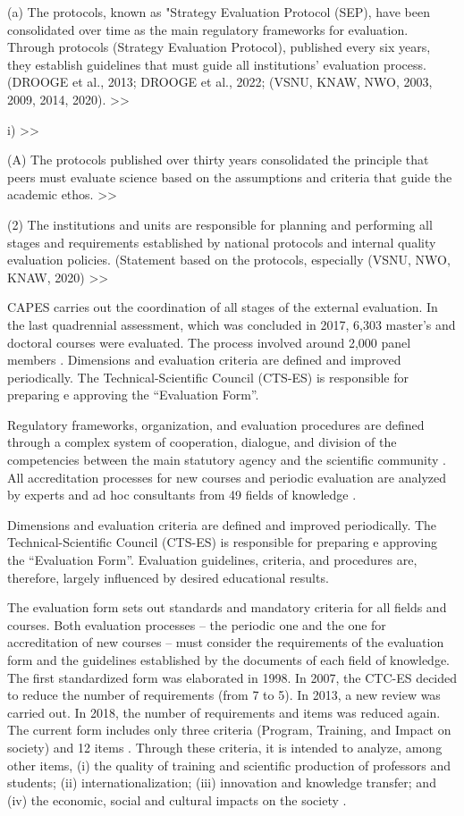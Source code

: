 (a)	The protocols, known as "Strategy Evaluation Protocol (SEP), have been consolidated over time as the main regulatory frameworks for evaluation. Through protocols (Strategy Evaluation Protocol), published every six years, they establish guidelines that must guide all institutions' evaluation process.  (DROOGE et al., 2013; DROOGE et al., 2022; (VSNU, KNAW, NWO, 2003, 2009, 2014, 2020). >>

i)	 >>

(A)	The protocols published over thirty years consolidated the principle that peers must evaluate science based on the assumptions and criteria that guide the academic ethos. >>



(2)	The institutions and units are responsible for planning and performing all stages and requirements established by national protocols and internal quality evaluation policies. (Statement based on the protocols, especially (VSNU, NWO, KNAW, 2020) >>


CAPES carries out the coordination of all stages of the external evaluation. In the last quadrennial assessment, which was concluded in 2017, 6,303 master’s and doctoral courses were evaluated. The process involved around 2,000 panel members \autocite{CAPES.2018}. Dimensions and evaluation criteria are defined and improved periodically. The Technical-Scientific Council (CTS-ES) is responsible for preparing e approving the “Evaluation Form”.

Regulatory frameworks, organization, and evaluation procedures are defined through a complex system of cooperation, dialogue, and division of the competencies between the main statutory agency and the scientific community \autocite{Viana.2018}. All accreditation processes for new courses and periodic evaluation are analyzed by experts and ad hoc consultants from 49 fields of knowledge \autocite{}. 




Dimensions and evaluation criteria are defined and improved periodically. The Technical-Scientific Council (CTS-ES) is responsible for preparing e approving the “Evaluation Form”. Evaluation guidelines, criteria, and procedures are, therefore, largely influenced by desired educational results. \autocite{Viana.2018}

The evaluation form sets out standards and mandatory criteria for all fields and courses. Both evaluation processes – the periodic one and the one for accreditation of new courses – must consider the requirements of the evaluation form and the guidelines established by the documents of each field of knowledge. The first standardized form was elaborated in 1998. In 2007, the CTC-ES decided to reduce the number of requirements (from 7 to 5). In 2013, a new review was carried out. In 2018, the number of requirements and items was reduced again. The current form includes only three criteria (Program, Training, and Impact on society) and 12 items \autocite{Monteiro.2019}. Through these criteria, it is intended to analyze, among other items, (i) the quality of training and scientific production of professors and students; (ii) internationalization; (iii) innovation and knowledge transfer; and (iv) the economic, social and cultural impacts on the society \autocite{Monteiro.2019}.

